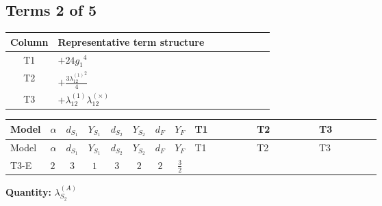 \documentclass[8pt]{article}
\begin{document}
\begin{landscape}
\subsection*{Terms 2 of 5}
\begin{center}
\begin{tabular}{@{}c >{\raggedright\arraybackslash}p{0.82\linewidth}@{}}
\toprule
Column & Representative term structure \\
\midrule
T1 & \(\displaystyle +24 {g_1}^4\) \\
\midrule
T2 & \(\displaystyle +\frac{3 {\lambda_{12}^{(1)}}^2}{4}\) \\
\midrule
T3 & \(\displaystyle +{\lambda_{12}^{(1)}} {\lambda_{12}^{(\times)}}\) \\
\midrule
\bottomrule
\end{tabular}
\end{center}
\smallskip
\tiny
\begin{longtable}{@{}llcccccc >{\raggedright\arraybackslash}p{0.21\linewidth} >{\raggedright\arraybackslash}p{0.21\linewidth} >{\raggedright\arraybackslash}p{0.21\linewidth}@{}}
\toprule
Model & $\alpha$ & $d_{S_1}$ & $Y_{S_1}$ & $d_{S_2}$ & $Y_{S_2}$ & $d_F$ & $Y_F$ & T1 & T2 & T3 \\
\midrule
\endfirsthead
\toprule
Model & $\alpha$ & $d_{S_1}$ & $Y_{S_1}$ & $d_{S_2}$ & $Y_{S_2}$ & $d_F$ & $Y_F$ & T1 & T2 & T3 \\
\midrule
\endhead
T3-E & $2$ & $3$ & $1$ & $3$ & $2$ & $2$ & $\frac{3}{2}$ & \scriptsize\adjustbox{max width=\linewidth}{$\begin{gathered} +24 {g_1}^4\end{gathered}$} & \scriptsize\adjustbox{max width=\linewidth}{$\begin{gathered} +\frac{3 {\lambda_{12}^{(1)}}^2}{4}\end{gathered}$} & \scriptsize\adjustbox{max width=\linewidth}{$\begin{gathered} +{\lambda_{12}^{(1)}} {\lambda_{12}^{(\times)}}\end{gathered}$} \\
\midrule
\bottomrule
\end{longtable}
\clearpage
\noindent\textbf{Quantity: }$\lambda_{S_2}^{(A)}$\par\smallskip

\end{landscape}
\end{document}
